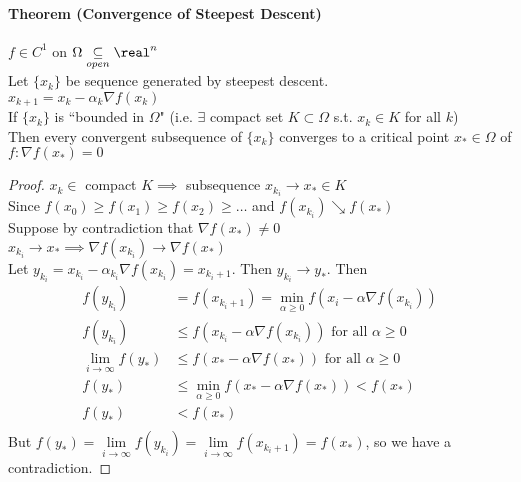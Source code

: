 \documentclass[11pt]{article}
\begin{document}
\paragraph{Theorem (Convergence of Steepest Descent)}
$f \in C^1$ on $\Omega \underset{open}{\subseteq} \real^n$ \\
Let $\{ x_k\}$ be sequence generated by steepest descent. \\
$x_{k+1} = x_k - \alpha_k \nabla f(x_k)$ \\
If $\{ x_k\}$ is ``bounded in $\Omega$" (i.e. $\exists$ compact set $K \subset \Omega$ s.t. $x_k \in K$ for all $k$)\\
Then every convergent subsequence of $\{ x_k\}$ converges to a critical point $x_* \in \Omega$ of $f: \nabla f(x_*) = 0$
\begin{proof}
	$x_k \in$ compact $K \implies$ subsequence $x_{k_i} \rightarrow x_* \in K$ \\
	Since $f(x_0) \geq f(x_1) \geq f(x_2) \geq \hdots$ and $f(x_{k_i}) \searrow f(x_*)$\\
	Suppose by contradiction that $\nabla f(x_*) \neq 0$ \\
	$x_{k_i} \rightarrow x_* \implies  \nabla f(x_{k_i}) \rightarrow \nabla f(x_*)$\\
	Let $y_{k_i} = x_{k_i} - \alpha_{k_i} \nabla f(x_{k_i}) = x_{k_i + 1}$. Then $y_{k_i} \rightarrow y_*$. Then
	\begin{align}
		f(y_{k_i}) &= f(x_{k_i + 1} ) = \underset{\alpha \geq 0}{\min} f(x_i - \alpha \nabla f(x_{k_i}))  \\
		f(y_{k_i}) &\leq f(x_{k_i} - \alpha \nabla f(x_{k_i})) \text{ for all $\alpha \geq 0$}\\
		\underset{i \rightarrow \infty}{\lim} f(y_*) &\leq f(x_* - \alpha \nabla f(x_*)) \text{ for all $\alpha \geq 0$} \\
		f(y_*) &\leq  \underset{\alpha \geq 0}{\min} f(x_* - \alpha \nabla f(x_*)) < f(x_*) \\
		f(y_*) &< f(x_*)\\
	\end{align}
	But $f(y_*) = \underset{i \rightarrow \infty}{\lim}f(y_{k_i}) = \underset{i \rightarrow \infty}{\lim}f(x_{k_i + 1}) = f(x_*)$, so we have a contradiction. 
\end{proof}
\end{document}
